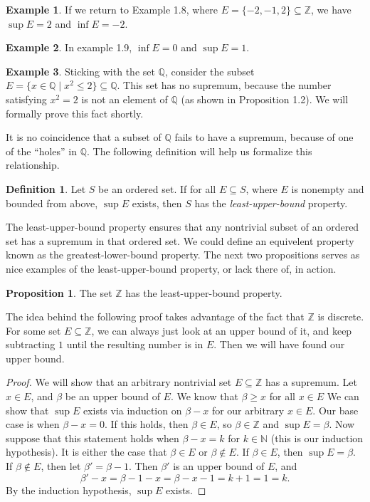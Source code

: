 \documentclass{article}
\newcommand{\N}{\mathbb{N}}
\newcommand{\Q}{\mathbb{Q}}
\newcommand{\Z}{\mathbb{Z}}
\theoremstyle{definition}
\newtheorem{proposition}{Proposition}[section]
\newtheorem{definition}{Definition}[section]
\newtheorem{example}{Example}[section]
\begin{document}
	\begin{example}
		If we return to Example 1.8, where $ E=\{-2,-1,2\}\subseteq\Z $, we have $ \sup E=2 $ and $ \inf E=-2 $. 
	\end{example}
	\begin{example}
		In example 1.9, $ \inf E=0 $ and $ \sup E=1 $.
	\end{example}
	\begin{example}
		Sticking with the set $ \Q$, consider the subset $ E=\{x\in\Q\mid x^2\le 2\}\subseteq \Q $. This set has no supremum, because the number satisfying $ x^2=2 $ is not an element of $ \Q $ (as shown in Proposition 1.2). We will formally prove this fact shortly. 
	\end{example}
	It is no coincidence that a subset of $ \Q $ fails to have a supremum, because of one of the ``holes'' in $ \Q $. The following definition will help us formalize this relationship. 
	\begin{definition}\label{def1.10}
		Let $ S $ be an ordered set. If for all $ E\subseteq S $, where $ E $ is nonempty and bounded from above, $ \sup E $ exists, then $ S $ has the \textit{\color{red}least-upper-bound} property. 
	\end{definition}
	The least-upper-bound property ensures that any nontrivial subset of an ordered set has a supremum in that ordered set. We could define an equivelent property known as the greatest-lower-bound property. The next two propositions serves as nice examples of the least-upper-bound property, or lack there of,  in action.
	\begin{proposition}
		The set $ \Z $ has the least-upper-bound property.
	\end{proposition}
	The idea behind the following proof takes advantage of the fact that $ \Z $ is discrete. For some set $ E\subseteq \Z $, we can always just look at an upper bound of it, and keep subtracting $ 1 $ until the resulting number is in $ E $. Then we will have found our upper bound.
	\begin{proof}
		We will show that an arbitrary nontrivial set $ E\subseteq \Z $ has a supremum. Let $ x\in E $, and $ \beta $ be an upper bound of $ E $. We know that $ \beta\ge x $ for all $ x\in E $ We can show that $ \sup E $ exists via induction on $ \beta-x $ for our arbitrary $ x\in E $. Our base case is when $ \beta-x=0 $. If this holds, then $ \beta\in E $, so $ \beta\in\Z $ and $ \sup E=\beta $. Now suppose that this statement holds when $ \beta-x=k $ for $ k\in\N $ (this is our induction hypothesis). It is either the case that $ \beta\in E $ or $ \beta\notin E $. If $ \beta\in E $, then $ \sup E=\beta $. If $ \beta \notin E $, then let $ \beta'=\beta -1 $. Then $ \beta' $ is an upper bound of $ E $, and $$\beta'-x=\beta-1-x=\beta-x-1=k+1=1=k .$$ By the induction hypothesis, $ \sup E $ exists.   
	\end{proof}
\end{document}
